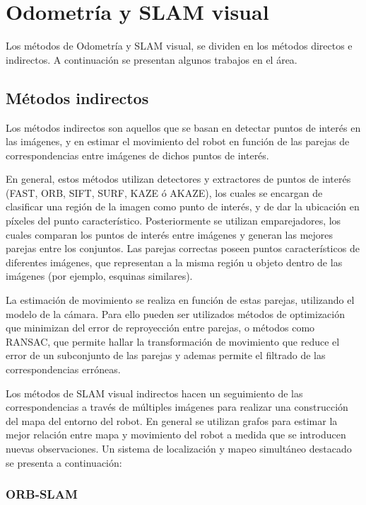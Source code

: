 \section{Odometría  y SLAM visual}

Los métodos de Odometría y SLAM visual, se dividen en los métodos directos e indirectos. A continuación se presentan algunos trabajos en el área.

\subsection{Métodos indirectos}

Los métodos indirectos son aquellos que se basan en detectar puntos de interés en las imágenes, y en estimar el movimiento del robot en función de las parejas de correspondencias entre imágenes de dichos puntos de interés.

En general, estos métodos utilizan detectores y extractores de puntos de interés (FAST, ORB, SIFT, SURF, KAZE ó AKAZE), los cuales se encargan de clasificar una región de la imagen como punto de interés, y de dar la ubicación en píxeles del punto característico. Posteriormente se utilizan emparejadores, los cuales comparan los puntos de interés entre imágenes y generan las mejores parejas entre los conjuntos. Las parejas correctas poseen puntos característicos de diferentes imágenes, que representan a la misma región u objeto dentro de las imágenes (por ejemplo, esquinas similares). 

La estimación de movimiento se realiza en función de estas parejas, utilizando el modelo de la cámara. Para ello pueden ser utilizados métodos de optimización que minimizan del error de reproyección entre parejas, o métodos como RANSAC, que permite hallar la transformación de movimiento que reduce el error de un subconjunto de las parejas y ademas permite el filtrado de las correspondencias erróneas.

Los métodos de SLAM visual indirectos hacen un seguimiento de las correspondencias a través de múltiples imágenes para realizar una construcción del mapa del entorno del robot. En general se utilizan grafos para estimar la mejor relación entre mapa y movimiento del robot a medida que se introducen nuevas observaciones. Un sistema de localización y mapeo simultáneo destacado se presenta a continuación:

\subsubsection{ORB-SLAM}

